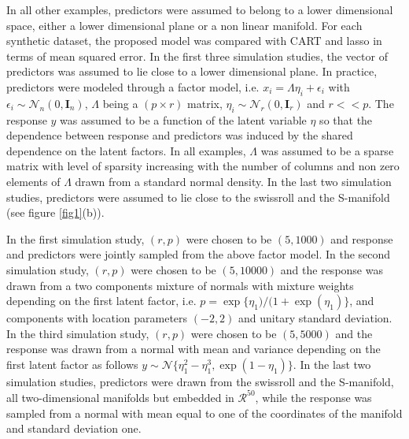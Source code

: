 \documentclass{article}
\providecommand{\mb}[1]{\boldsymbol{#1}}
\providecommand{\mc}[1]{\mathcal{#1}}
\begin{document}
In all other examples, predictors were assumed to belong to a lower dimensional space, either a lower dimensional plane or a non linear manifold. For each synthetic dataset, the proposed model was compared with CART and lasso in terms of mean squared error. In the first three simulation studies, the vector of predictors was assumed to lie close to a lower dimensional plane. In practice,  predictors were modeled through a factor model, i.e. $x_i=\Lambda \eta_i + \epsilon_i$ with $\epsilon_i \sim \mc{N}_n(0,\mb{I}_n)$, $\Lambda$ being a $(p \times r)$ matrix, $\eta_i \sim \mc{N}_r(0,\mb{I}_r)$ and $r<<p$. The response $y$ was assumed to be a function of the latent variable $\eta$ so that  the dependence between response and predictors was induced by the shared dependence on the latent factors.  In all examples, $\Lambda$ was assumed to be a sparse matrix with level of sparsity increasing with the number of columns and non zero elements of $\Lambda$ drawn from a standard normal density. In the last two simulation studies, predictors were assumed to lie close to the swissroll and the S-manifold (see figure \ref{fig1}(b)).
%


In the first simulation study, $(r,p)$ were chosen to be $(5,1000)$ and response and predictors were jointly sampled from the above factor model.  In the second simulation study, $(r,p)$ were chosen to be $(5,10000)$ and the response was drawn from a two components mixture of normals with mixture weights depending on the first latent factor, i.e. $p=\exp\{\eta_1)/(1+\exp(\eta_1)\}$, and components with location parameters $(-2,2)$ and unitary standard deviation.  In the third simulation study, $(r,p)$ were chosen to be $(5,5000)$ and the response was drawn from a normal with mean and variance depending on the first latent factor as follows $y \sim \mc{N}\{\eta_1^2-\eta_1^3, \exp(1-\eta_1)\}$. In the last two simulation studies, predictors were drawn from the swissroll and the S-manifold, all two-dimensional manifolds but embedded in $\mathcal{R}^{50}$, while the response was sampled from a normal with mean equal to one of the coordinates of the manifold and standard deviation one.
\end{document}
